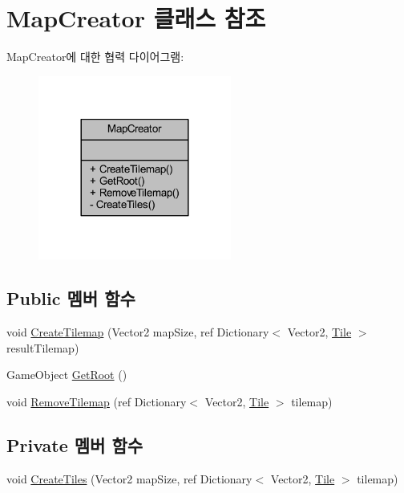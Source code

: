 \hypertarget{class_map_creator}{}\section{Map\+Creator 클래스 참조}
\label{class_map_creator}


Map\+Creator에 대한 협력 다이어그램\+:\nopagebreak
\begin{figure}[H]
\begin{center}
\leavevmode
\includegraphics[width=180pt]{class_map_creator__coll__graph}
\end{center}
\end{figure}
\subsection*{Public 멤버 함수}
\begin{DoxyCompactItemize}
\item 
void \hyperlink{class_map_creator_a80d7f9ebca92a02da259157958929a6d}{Create\+Tilemap} (Vector2 map\+Size, ref Dictionary$<$ Vector2, \hyperlink{class_tile}{Tile} $>$ result\+Tilemap)
\item 
Game\+Object \hyperlink{class_map_creator_aa7308965858123141f44438bb017acc8}{Get\+Root} ()
\item 
void \hyperlink{class_map_creator_afb12afa9a9ca8fe04701af4b494e1c8a}{Remove\+Tilemap} (ref Dictionary$<$ Vector2, \hyperlink{class_tile}{Tile} $>$ tilemap)
\end{DoxyCompactItemize}
\subsection*{Private 멤버 함수}
\begin{DoxyCompactItemize}
\item 
void \hyperlink{class_map_creator_aff7c3fbefa2dd4f091ded379ca000a23}{Create\+Tiles} (Vector2 map\+Size, ref Dictionary$<$ Vector2, \hyperlink{class_tile}{Tile} $>$ tilemap)
\end{DoxyCompactItemize}


